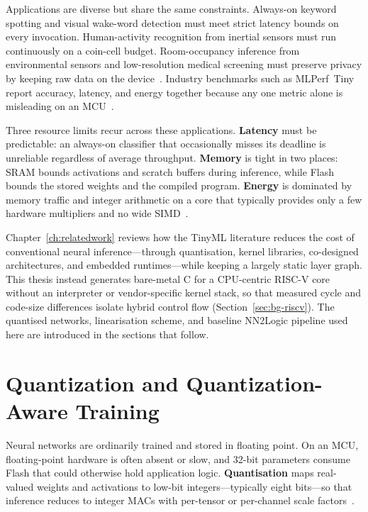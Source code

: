 Applications are diverse but share the same constraints.
Always-on keyword spotting and visual wake-word detection must meet strict latency bounds on every invocation.
Human-activity recognition from inertial sensors must run continuously on a coin-cell budget.
Room-occupancy inference from environmental sensors and low-resolution medical screening must preserve privacy by keeping raw data on the device~\cite{banbury2021mlperftiny}.
Industry benchmarks such as MLPerf~Tiny report accuracy, latency, and energy together because any one metric alone is misleading on an \ac{MCU}~\cite{banbury2021mlperftiny}.

Three resource limits recur across these applications.
\textbf{Latency} must be predictable: an always-on classifier that occasionally misses its deadline is unreliable regardless of average throughput.
\textbf{Memory} is tight in two places: \ac{SRAM} bounds activations and scratch buffers during inference, while Flash bounds the stored weights and the compiled program.
\textbf{Energy} is dominated by memory traffic and integer arithmetic on a core that typically provides only a few hardware multipliers and no wide SIMD~\cite{stein2026nn2logic}.

Chapter~\ref{ch:relatedwork} reviews how the TinyML literature reduces the cost of conventional neural inference---through quantisation, kernel libraries, co-designed architectures, and embedded runtimes---while keeping a largely static layer graph.
This thesis instead generates bare-metal C for a \ac{CPU}-centric \mbox{RISC-V} core without an interpreter or vendor-specific kernel stack, so that measured cycle and code-size differences isolate hybrid control flow (Section~\ref{sec:bg-riscv}).
The quantised networks, linearisation scheme, and baseline NN2Logic pipeline used here are introduced in the sections that follow.


\section{Quantization and Quantization-Aware Training}
\label{sec:bg-quant}

Neural networks are ordinarily trained and stored in floating point.
On an \ac{MCU}, floating-point hardware is often absent or slow, and 32-bit parameters consume Flash that could otherwise hold application logic.
\textbf{Quantisation} maps real-valued weights and activations to low-bit integers---typically eight bits---so that inference reduces to integer \acp{MAC} with per-tensor or per-channel scale factors~\cite{jacob2018quantization}.


